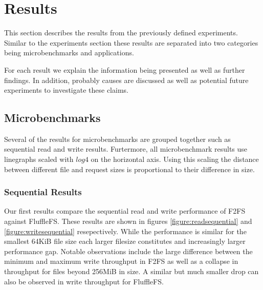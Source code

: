 \chapter{Results}

This section describes the results from the previously defined experiments.
Similar to the experiments section these results are separated into two
categories being microbenchmarks and applications.

For each result we explain the information being presented as well as further
findings. In addition, probably causes are discussed as well as
potential future experiments to investigate these claims.

\section{Microbenchmarks}

Several of the results for microbenchmarks are grouped together such as
sequential read and write results. Furtermore, all microbenchmark results use
linegraphs scaled with $log4$ on the horizontal axis. Using this scaling the
distance between different file and request sizes is proportional to their
difference in size.

\subsection{Sequential Results}

Our first results compare the sequential read and write performance of F2FS
against FluffleFS. These results are shown in figures
\ref{figure:readsequential} and \ref{figure:writesequential} resepectively.
While the performance is similar for the smallest 64KiB file size each larger
filesize constitutes and increasingly larger performance gap. Notable
observations include the large difference between the minimum and
maximum write throughput in F2FS as well as a collapse in throughput for files
beyond 256MiB in size. A similar but much smaller drop can also be observed in
write throughput for FluffleFS.

